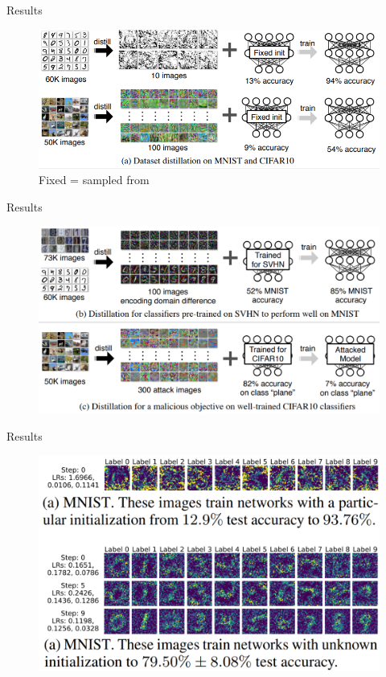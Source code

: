 \documentclass{beamer}
\begin{document}
\begin{frame}{Results}
\begin{figure}[h]
\includegraphics[width=\textwidth]{img/uses1}
\caption{Fixed = sampled from }
\end{figure}
\end{frame}
\begin{frame}{Results}
\begin{figure}[h]
\includegraphics[width=\textwidth]{img/uses2}
\end{figure}
\end{frame}
\begin{frame}{Results}
\begin{figure}[h]
\includegraphics[width=\textwidth]{img/results1}
\end{figure}
\end{frame}
\end{document}
